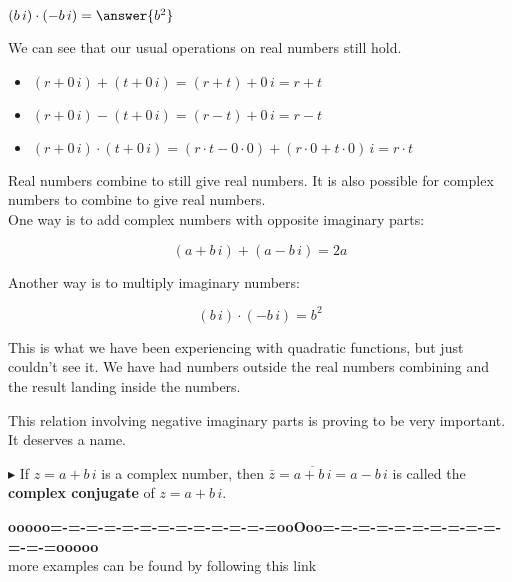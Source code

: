 \documentclass{ximera}
\begin{document}
\begin{question}


\item   $(b \, i) \cdot  (-b \, i) = \answer{b^2}$


\end{question}






We can see that our usual operations on real numbers still hold.

\begin{itemize}
\item $(r + 0 \, i) + (t + 0 \, i) = (r + t) + 0 \, i = r + t$ \\ 
\item $(r + 0 \, i) - (t + 0 \, i) = (r - t) + 0 \, i = r - t$ \\ 
\item $(r + 0 \, i) \cdot (t + 0 \, i) = (r \cdot t - 0 \cdot 0) + (r \cdot 0 + t \cdot 0) \, i = r \cdot t$ \\ 
\end{itemize}


Real numbers combine to still give real numbers.  It is also possible for complex numbers to combine to give real numbers. \\


One way is to add complex numbers with opposite imaginary parts:

\[
(a + b \, i) + (a - b \, i) = 2a
\]



Another way is to multiply imaginary numbers:

\[
(b \, i) \cdot (-b \, i) = b^2
\]



This is what we have been experiencing with quadratic functions, but just couldn't see it.  We have had numbers outside the real numbers combining and the result landing inside the numbers.




This relation involving negative imaginary parts is proving to be very important.  It deserves a name.


\textbf{\textcolor{red!90!darkgray}{$\blacktriangleright$}} If $z = a + b \, i$ is a complex number, then $\bar{z} = \overline{a + b \, i} = a - b \, i$ is called the \textbf{\textcolor{purple!85!blue}{complex conjugate}} of $z = a + b \, i$.












\begin{center}
\textbf{\textcolor{green!50!black}{ooooo=-=-=-=-=-=-=-=-=-=-=-=-=ooOoo=-=-=-=-=-=-=-=-=-=-=-=-=ooooo}} \\

more examples can be found by following this link\\ 

\end{center}
\end{document}

